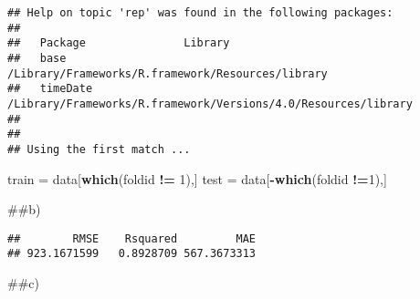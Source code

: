 \documentclass[
]{article}
\newenvironment{Shaded}{\begin{snugshade}}{\end{snugshade}}
\newcommand{\CommentTok}[1]{\textcolor[rgb]{0.56,0.35,0.01}{\textit{#1}}}
\newcommand{\DataTypeTok}[1]{\textcolor[rgb]{0.13,0.29,0.53}{#1}}
\newcommand{\DecValTok}[1]{\textcolor[rgb]{0.00,0.00,0.81}{#1}}
\newcommand{\KeywordTok}[1]{\textcolor[rgb]{0.13,0.29,0.53}{\textbf{#1}}}
\newcommand{\NormalTok}[1]{#1}
\newcommand{\OperatorTok}[1]{\textcolor[rgb]{0.81,0.36,0.00}{\textbf{#1}}}
\newcommand{\StringTok}[1]{\textcolor[rgb]{0.31,0.60,0.02}{#1}}
\begin{document}
\begin{verbatim}
## Help on topic 'rep' was found in the following packages:
## 
##   Package               Library
##   base                  /Library/Frameworks/R.framework/Resources/library
##   timeDate              /Library/Frameworks/R.framework/Versions/4.0/Resources/library
## 
## 
## Using the first match ...
\end{verbatim}

\begin{Shaded}
\begin{Highlighting}[]
\NormalTok{train =}\StringTok{ }\NormalTok{data[}\KeywordTok{which}\NormalTok{(foldid }\OperatorTok{!=}\StringTok{ }\DecValTok{1}\NormalTok{),]}
\NormalTok{test =}\StringTok{ }\NormalTok{data[}\OperatorTok{-}\KeywordTok{which}\NormalTok{(foldid }\OperatorTok{!=}\DecValTok{1}\NormalTok{),]}
\end{Highlighting}
\end{Shaded}

\#\#b)

\begin{Shaded}
\end{Shaded}

\begin{verbatim}
##        RMSE    Rsquared         MAE 
## 923.1671599   0.8928709 567.3673313
\end{verbatim}

\#\#c)
\end{document}
